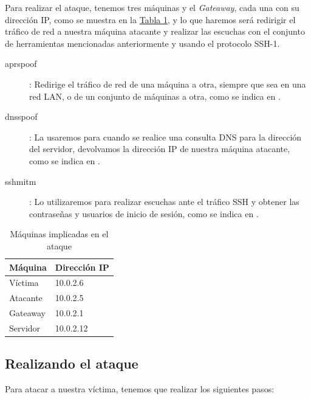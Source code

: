 \documentclass[10pt,a4paper,spanish]{article}
\begin{document}
Para realizar el ataque, tenemos tres máquinas y el \textit{Gateaway}, cada una con su dirección IP, como se muestra en la \hyperref[maquinas]{Tabla \ref*{maquinas}}, y lo que haremos será redirigir el tráfico de red a nuestra máquina atacante y realizar las escuchas con el conjunto de herramientas mencionadas anteriormente y usando el protocolo SSH-1.

\begin{description}
    \item [aprspoof]: Redirige el tráfico de red de una máquina a otra, siempre que sea en una red LAN, o de un conjunto de máquinas a otra, como se indica en \cite{arpspoof}.
    \item [dnsspoof]: La usaremos para cuando se realice una consulta DNS para la dirección del servidor, devolvamos la dirección IP de nuestra máquina atacante, como se indica en \cite{dnsspoof}.
    \item [sshmitm]: Lo utilizaremos para realizar escuchas ante el tráfico SSH y obtener las contraseñas y usuarios de inicio de sesión, como se indica en \cite{sshmitm}.
\end{description}

\begin{table}[H]
    \centering
    \begin{tabular}{|l|l|}
    \hline
    Máquina & Dirección IP \\
    \hline
    Víctima & 10.0.2.6 \\
    \hline
    Atacante & 10.0.2.5 \\
    \hline
    Gateaway & 10.0.2.1 \\
    \hline
    Servidor & 10.0.2.12 \\
    \hline
    \end{tabular}
    \caption{Máquinas implicadas en el ataque}
    \label{maquinas}
\end{table}

\subsection{Realizando el ataque}

Para atacar a nuestra víctima, tenemos que realizar los siguientes pasos:
\end{document}

